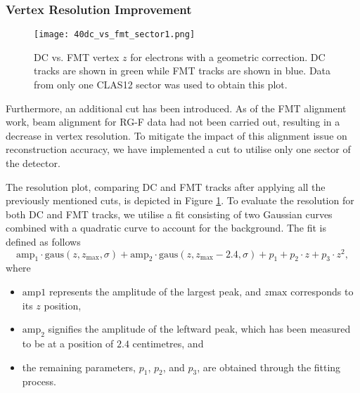 \subsubsection{Vertex Resolution Improvement}
\label{12.43::vertex_resolution_improvement}

    \begin{figure}[b!]
        \texttt{[image: 40dc\_vs\_fmt\_sector1.png]}
        \caption[DC vs. FMT $z$ with geometry correction]
        {DC vs. FMT vertex $z$ for electrons with a geometric correction.
        DC tracks are shown in green while FMT tracks are shown in blue.
        Data from only one CLAS12 sector was used to obtain this plot.}
        \label{fig::12.43::dc_vs_fmt_vz_11983_corrected}
    \end{figure}

    Furthermore, an additional cut has been introduced.
    As of the FMT alignment work, beam alignment for RG-F data had not been carried out, resulting in a decrease in vertex resolution.
    To mitigate the impact of this alignment issue on reconstruction accuracy, we have implemented a cut to utilise only one sector of the detector.

    The resolution plot, comparing DC and FMT tracks after applying all the previously mentioned cuts, is depicted in Figure \ref{fig::12.43::dc_vs_fmt_vz_11983_corrected}.
    To evaluate the resolution for both DC and FMT tracks, we utilise a fit consisting of two Gaussian curves combined with a quadratic curve to account for the background.
    The fit is defined as follows
    \begin{equation*}
        \text{amp}_1 \cdot \text{gaus}(z, z_\text{max}, \sigma) + \text{amp}_2 \cdot \text{gaus}(z, z_\text{max} - 2.4, \sigma) + p_1 + p_2\cdot z + p_3\cdot z^2,
    \end{equation*}
    where
    \begin{itemize}
        \item
            $\text{amp}1$ represents the amplitude of the largest peak, and $z\text{max}$ corresponds to its $z$ position,
        \item
            $\text{amp}_2$ signifies the amplitude of the leftward peak, which has been measured to be at a position of $2.4$ centimetres, and
        \item
            the remaining parameters, $p_1$, $p_2$, and $p_3$, are obtained through the fitting process.
    \end{itemize}

